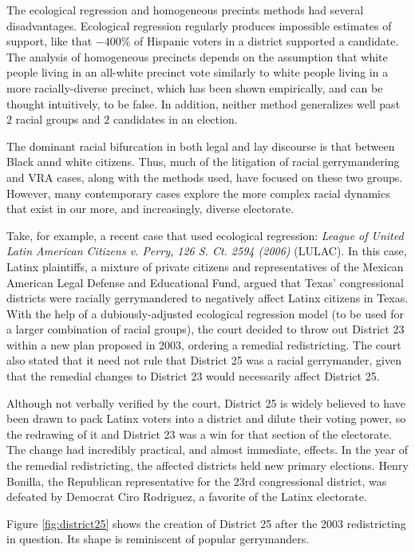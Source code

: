 \documentclass[fleqn,10pt]{style}
\begin{document}
The ecological regression and homogeneous precints methods had several disadvantages. Ecological regression regularly produces impossible estimates of support, like that $-400\%$ of Hispanic voters in a district supported a candidate. The analysis of homogeneous precincts depends on the assumption that white people living in an all-white precinct vote similarly to white people living in a more racially-diverse precinct, which has been shown empirically, and can be thought intuitively, to be false.\cite{greiner} In addition, neither method generalizes well past $2$ racial groups and $2$ candidates in an election.

The dominant racial bifurcation in both legal and lay discourse is that between Black annd white citizens. Thus, much of the litigation of racial gerrymandering and VRA cases, along with the methods used, have focused on these two groups. However, many contemporary cases explore the more complex racial dynamics that exist in our more, and increasingly, diverse electorate.

Take, for example, a recent case that used ecological regression: \textit{League of United Latin American Citizens v. Perry, 126 S. Ct. 2594 (2006)} (LULAC). In this case, Latinx plaintiffs, a mixture of private citizens and representatives of the Mexican American Legal Defense and Educational Fund, argued that Texas' congressional districts were racially gerrymandered to negatively affect Latinx citizens in Texas. With the help of a dubiously-adjusted ecological regression model (to be used for a larger combination of racial groups), the court decided to throw out District 23 within a new plan proposed in 2003, ordering a remedial redistricting.\cite{LULAC} The court also stated that it need not rule that District 25 was a racial gerrymander, given that the remedial changes to District 23 would necessarily affect District 25.

Although not verbally verified by the court, District 25 is widely believed to have been drawn to pack Latinx voters into a district and dilute their voting power, so the redrawing of it and District 23 was a win for that section of the electorate. The change had incredibly practical, and almost immediate, effects. In the year of the remedial redistricting, the affected districts held new primary elections. Henry Bonilla, the Republican representative for the 23rd congressional district, was defeated by Democrat Ciro Rodriguez, a favorite of the Latinx electorate.

Figure \ref{fig:district25} shows the creation of District 25 after the 2003 redistricting in question. Its shape is reminiscent of popular gerrymanders.
\end{document}
